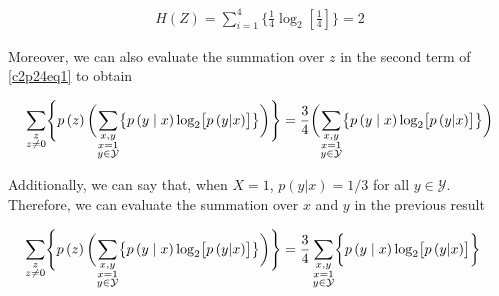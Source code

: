 \documentclass[ClusteringConnectionsMAIN.tex]{subfiles}
\begin{document}
\begin{align} \label{c2p24eq2}
H \left( Z \right) = \sum_{i=1}^4 \biggl\{ \frac{1}{4} \log_2 \left[ \frac{1}{4} \right] \biggr\} = 2  \tag{2.24-2}
\end{align}

Moreover, we can also evaluate the summation over $z$ in the second term of \ref{c2p24eq1} to obtain

\begin{align}
\sum_{\substack{z \\ z \neq 0}} \Biggl\{ p \left( z \right) \biggl( \sum_{\substack{x, y \\ x = 1 \\ y \in \mathcal{Y}}} \bigl\{ p \left( y \mid x \right) \log_2 \bigl[ p \left( y | x \right) \bigr] \bigr\} \biggr) \Biggr\} &= \frac{3}{4} \biggl( \sum_{\substack{x, y \\ x = 1 \\ y \in \mathcal{Y}}} \bigl\{ p \left( y \mid x \right) \log_2 \bigl[ p \left( y | x \right) \bigr] \bigr\} \biggr) \notag \\
\end{align}

Additionally, we can say that, when $X = 1$, $p \left( y | x \right) = 1/3$ for all $y \in \mathcal{Y}$.  Therefore, we can evaluate the summation over $x$ and $y$ in the previous result

\begin{align}
\sum_{\substack{z \\ z \neq 0}} \Biggl\{ p \left( z \right) \biggl( \sum_{\substack{x, y \\ x = 1 \\ y \in \mathcal{Y}}} \bigl\{ p \left( y \mid x \right) \log_2 \bigl[ p \left( y | x \right) \bigr] \bigr\} \biggr) \Biggr\} &= \frac{3}{4} \sum_{\substack{x, y \\ x = 1 \\ y \in \mathcal{Y}}} \biggl\{ p \left( y \mid x \right) \log_2 \bigl[ p \left( y | x \right) \bigr] \biggr\} \notag
\end{align}
\end{document}
